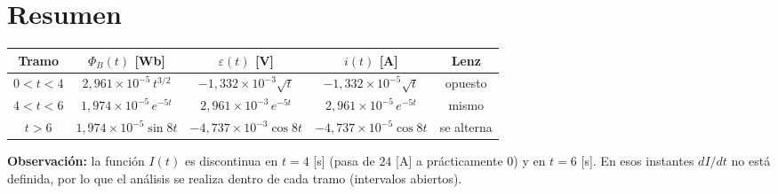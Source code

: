 \documentclass[12pt,letterpaper]{article}
\newcommand{\eps}{\varepsilon}
\begin{document}
\section*{Resumen}

\begin{center}
\renewcommand{\arraystretch}{1.5}
\begin{tabular}{|c|c|c|c|c|}
\hline
\textbf{Tramo} & $\Phi_B(t)$ [Wb] & $\eps(t)$ [V] & $i(t)$ [A] & \textbf{Lenz} \\
\hline
$0<t<4$ & $2{,}961\times10^{-5}\,t^{3/2}$ & $-1{,}332\times10^{-3}\sqrt{t}$
        & $-1{,}332\times10^{-5}\sqrt{t}$ & opuesto \\
$4<t<6$ & $1{,}974\times10^{-5}\,e^{-5t}$ & $2{,}961\times10^{-3}\,e^{-5t}$
        & $2{,}961\times10^{-5}\,e^{-5t}$ & mismo \\
$t>6$ & $1{,}974\times10^{-5}\sin 8t$ & $-4{,}737\times10^{-3}\cos 8t$
      & $-4{,}737\times10^{-5}\cos 8t$ & se alterna \\
\hline
\end{tabular}
\end{center}

\noindent\textbf{Observaci\'on:} la funci\'on $I(t)$ es discontinua en $t = 4$ [s] (pasa de $24$ [A] a
pr\'acticamente $0$) y en $t = 6$ [s]. En esos instantes $dI/dt$ no est\'a definida, por lo que el
an\'alisis se realiza dentro de cada tramo (intervalos abiertos).
\end{document}
